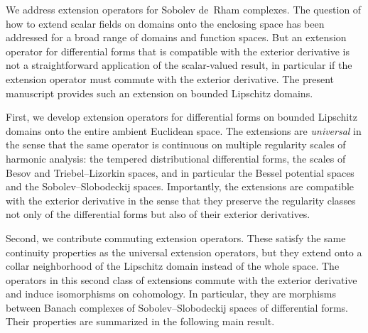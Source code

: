 \documentclass[10pt,a4paper]{amsart}
\theoremstyle{definition}
\theoremstyle{remark}
\numberwithin{equation}{section}
\begin{document}
We address extension operators for Sobolev de~Rham complexes.
The question of how to extend scalar fields on domains onto the enclosing space has been addressed for a broad range of domains and function spaces.
But an extension operator for differential forms that is compatible with the exterior derivative is not a straightforward application of the scalar-valued result, in particular if the extension operator must commute with the exterior derivative. 
The present manuscript provides such an extension on bounded Lipschitz domains.



First, we develop extension operators for differential forms on bounded Lipschitz domains onto the entire ambient Euclidean space. 
The extensions are \emph{universal} in the sense that the same operator is continuous on multiple regularity scales of harmonic analysis: the tempered distributional differential forms, the scales of Besov and Triebel--Lizorkin spaces, and in particular the Bessel potential spaces and the Sobolev--Slobodeckij spaces. 
Importantly, the extensions are compatible with the exterior derivative in the sense that they preserve the regularity classes not only of the differential forms but also of their exterior derivatives. 

Second, we contribute commuting extension operators.
These satisfy the same continuity properties as the universal extension operators, but they extend onto a collar neighborhood of the Lipschitz domain instead of the whole space.
The operators in this second class of extensions commute with the exterior derivative and induce isomorphisms on cohomology. 
In particular, they are morphisms between Banach complexes of Sobolev--Slobodeckij spaces of differential forms.
Their properties are summarized in the following main result.
\end{document}
